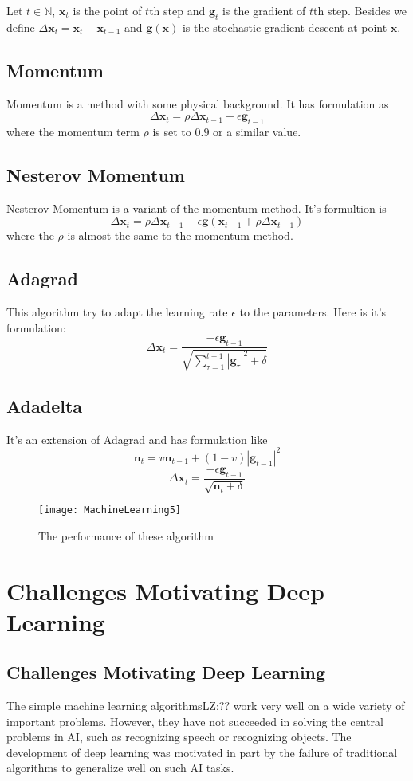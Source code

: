 	Let $t\in \mathbb N$, $\bm x_t$ is the point of $t$th step and $\bm g_t$ is the gradient of $t$th step. Besides we define $\Delta \bm x_t=\bm x_{t}-\bm x_{t-1}$ and $\bm g(\bm x)$ is the stochastic gradient descent at point $\bm x$.
    \subsection{Momentum}
    Momentum is a method with some physical background. It has formulation as
    $$
    	\Delta \bm x_t = \rho \Delta \bm x_{t-1} - \epsilon \bm g_{t-1}
    $$
    where the momentum term $\rho$ is set to $0.9$ or a similar value.
    \subsection{Nesterov Momentum}
    Nesterov Momentum is a variant of the momentum method. It's formultion is
    $$
    \Delta \bm x_t = \rho \Delta \bm x_{t-1} -\epsilon \bm g (\bm x_{t-1} + \rho \Delta \bm x_{t-1})
    $$
    where the $\rho$ is almost the same to the momentum method.
    \subsection{Adagrad}
    This algorithm try to adapt the learning rate $\epsilon$ to the parameters. Here is it's formulation:
    $$
    \Delta \bm x_t = \dfrac{ -\epsilon \bm g_{t-1}}{\sqrt{\sum_{\tau =1}^{t-1} |\bm g_{\tau}|^2 + \delta}}
    $$
    \subsection{Adadelta}
    It's an extension of Adagrad and has formulation like
    $$
    \bm n_t = v\bm n_{t-1}+(1-v)|\bm g_{t-1}|^2
    $$
    $$
    \Delta \bm x_t = \dfrac{ -\epsilon \bm g_{t-1}}{\sqrt{\bm  n_t + \delta}}
    $$
    
    
    \begin{figure}
        \caption{The performance of these algorithm}
        \texttt{[image: MachineLearning5]}\label{5}
    \end{figure}

\section{Challenges Motivating Deep Learning}


\subsection{Challenges Motivating Deep Learning}
    The simple machine learning algorithms{\color{red}LZ:??} work very well on a wide variety of important problems. However, they have not succeeded in solving the central problems in AI, such as recognizing speech or recognizing objects. The development of deep learning was motivated in part by the failure of traditional algorithms to generalize well on such AI tasks.
    
